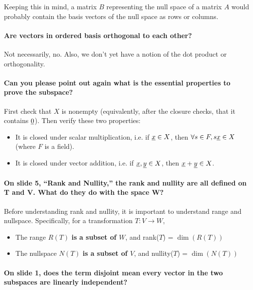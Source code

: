 \documentclass[10pt,english]{article}
\begin{document}
Keeping this in mind, a matrix $B$ representing the null space of a matrix $A$ would probably contain the basis vectors of the null space as rows or columns.

\paragraph{Are vectors in ordered basis orthogonal to each other?}

Not necessarily, no.
Also, we don't yet have a notion of the dot product or orthogonality.

\paragraph{Can you please point out again what is the essential properties to prove the subspace?}

First check that $X$ is nonempty (equivalently, after the closure checks, that it contains $\underline{0}$). Then verify these two properties:
\begin{itemize}
    \item It is closed under scalar multiplication, i.e. if $\underline{x}\in X$, then $\forall s\in F, s\underline{x} \in X$ (where $F$ is a field).
    \item It is closed under vector addition, i.e. if $\underline{x},\underline{y} \in X $, then $\underline{x}+\underline{y} \in X$.
\end{itemize}

\paragraph{On slide 5, ``Rank and Nullity,'' the rank and nullity are all defined on T and V. What do they do with the space W?}
Before understanding rank and nullity, it is important to understand range and nullspace.
Specifically, for a transformation $T:V \rightarrow W$,
\begin{itemize}
    \item The range $R(T)$ \textbf{is a subset of $W$}, and rank($T$) = $\dim(R(T))$
    \item The nullspace $N(T)$ \textbf{is a subset of $V$}, and nullity($T$) = $\dim(N(T))$
\end{itemize}

\paragraph{On slide 1, does the term disjoint mean every vector in the two subspaces are linearly independent?}
\end{document}
